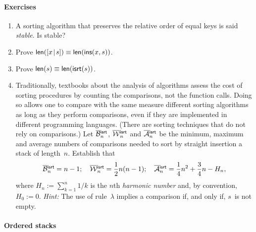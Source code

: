 \paragraph{Exercises}
\begin{enumerate}

  \item A sorting algorithm that preserves the relative order of equal
    keys is said \emph{stable}. Is
     stable?

  \item Prove \(\textsf{len}([{x}\!\mid\!{s}]) \equiv
    \textsf{len}(\textsf{ins}(x,s))\).

  \item Prove \(\textsf{len}(s) \equiv \textsf{len}(\textsf{isrt}(s))\).

  \item Traditionally, textbooks about the analysis of algorithms
    assess the cost of sorting procedures by counting the comparisons,
    not the function calls. Doing so allows one to compare with the
    same measure different sorting algorithms as long as they perform
    comparisons, even if they are implemented in different programming
    languages. (There are sorting techniques that do not rely on
    comparisons.) Let
    \(\OB{\fun{isrt}}{n}\),
    \(\OW{\fun{isrt}}{n}\) and
    \(\OM{\fun{isrt}}{n}\) be the
    minimum, maximum and average numbers of comparisons needed to sort
    by straight insertion a stack of length~\(n\). Establish that
    \begin{equation*}
      \OB{\fun{isrt}}{n} = n - 1; \quad
      \OW{\fun{isrt}}{n} = \frac{1}{2}n(n - 1); \quad
      \OM{\fun{isrt}}{n} = \frac{1}{4}n^2 + \frac{3}{4}n - H_n,
    \end{equation*}
    where \(H_n := \sum_{k=1}^n{1/k}\) is the \(n\)th \emph{harmonic
      number} and, by convention, \(H_0 :=
    0\). \emph{Hint:} The use of rule~\(\lambda\) implies a comparison
    if, and only if, \(s\)~is not empty.

\end{enumerate}

\paragraph{Ordered stacks}

